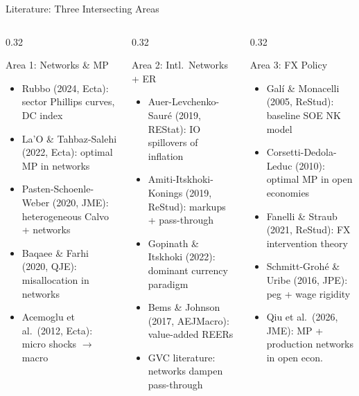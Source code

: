 \documentclass[aspectratio=169]{beamer}
\begin{document}
\begin{frame}{Literature: Three Intersecting Areas}
\begin{columns}
\begin{column}{0.32\textwidth}
\begin{block}{\small Area 1: Networks \& MP}
\small
\begin{itemize}
    \item Rubbo (2024, Ecta): sector Phillips curves, DC index
    \item La'O \& Tahbaz-Salehi (2022, Ecta): optimal MP in networks
    \item Pasten-Schoenle-Weber (2020, JME): heterogeneous Calvo + networks
    \item Baqaee \& Farhi (2020, QJE): misallocation in networks
    \item Acemoglu et al.\ (2012, Ecta): micro shocks $\to$ macro
\end{itemize}
\end{block}
\end{column}
\begin{column}{0.32\textwidth}
\begin{block}{\small Area 2: Intl.\ Networks + ER}
\small
\begin{itemize}
    \item Auer-Levchenko-Sauré (2019, REStat): IO spillovers of inflation
    \item Amiti-Itskhoki-Konings (2019, ReStud): markups + pass-through
    \item Gopinath \& Itskhoki (2022): dominant currency paradigm
    \item Bems \& Johnson (2017, AEJMacro): value-added REERs
    \item GVC literature: networks dampen pass-through
\end{itemize}
\end{block}
\end{column}
\begin{column}{0.32\textwidth}
\begin{block}{\small Area 3: FX Policy}
\small
\begin{itemize}
    \item Galí \& Monacelli (2005, ReStud): baseline SOE NK model
    \item Corsetti-Dedola-Leduc (2010): optimal MP in open economies
    \item Fanelli \& Straub (2021, ReStud): FX intervention theory
    \item Schmitt-Grohé \& Uribe (2016, JPE): peg + wage rigidity
    \item Qiu et al.\ (2026, JME): MP + production networks in open econ.
\end{itemize}
\end{block}
\end{column}
\end{columns}
\end{frame}
\end{document}

